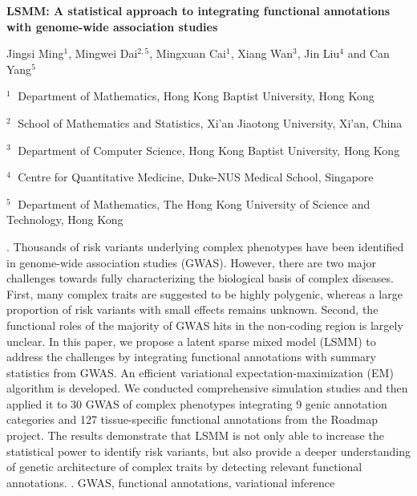 \documentclass[12pt]{article}
\begin{document}
\begin{flushleft}
{\LARGE\bf LSMM: A statistical approach to integrating functional annotations with genome-wide association studies}
\vspace{1.0cm}

Jingsi Ming$^1$, Mingwei Dai$^{2,5}$, Mingxuan Cai$^1$, Xiang Wan$^3$, Jin Liu$^4$ and Can Yang$^5$ 
\begin{description}
\item $^1 \;$ Department of Mathematics, Hong Kong Baptist University, Hong Kong
\item $^2 \;$ School of Mathematics and Statistics, Xi’an Jiaotong University, Xi’an, China
\item $^3 \;$ Department of Computer Science, Hong Kong Baptist University, Hong Kong
\item $^4 \;$ Centre for Quantitative Medicine, Duke-NUS Medical School, Singapore
\item $^5 \;$ Department of Mathematics, The Hong Kong University of Science and Technology, Hong Kong
\end{description}
\end{flushleft}
\vspace{0.75cm}
. Thousands of risk variants underlying complex phenotypes have been identified in genome-wide association studies (GWAS). However, there are two major challenges towards fully characterizing the biological basis of complex diseases. First, many complex traits are suggested to be highly polygenic, whereas a large proportion of risk variants with small effects remains unknown. Second, the functional roles of the majority of GWAS hits in the non-coding region is largely unclear. In this paper, we propose a latent sparse mixed model (LSMM) to address the challenges by integrating functional annotations with summary statistics from GWAS. An efficient variational expectation-maximization (EM) algorithm is developed. We conducted comprehensive simulation studies and then applied it to 30 GWAS of complex phenotypes integrating 9 genic annotation categories and 127 tissue-specific functional annotations from the Roadmap project. The results demonstrate that LSMM is not only able to increase the statistical power to identify risk variants, but also provide a deeper understanding of genetic architecture of complex traits by detecting relevant functional annotations.
\vskip 2mm
.
GWAS, functional annotations, variational inference
\end{document}
